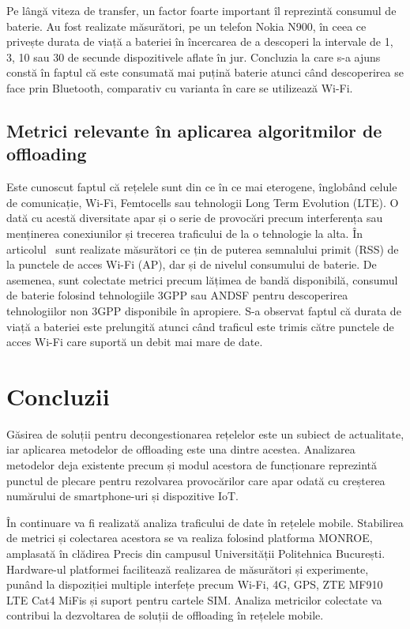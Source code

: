 \documentclass[12pt,a4paper]{report}
\begin{document}
Pe lângă viteza de transfer, un factor foarte important îl reprezintă consumul de baterie. Au fost realizate măsurători, pe un telefon Nokia N900, în ceea ce privește durata de viață a bateriei în încercarea de a descoperi la intervale de 1, 3, 10 sau 30 de secunde dispozitivele aflate în jur. Concluzia la care s-a ajuns constă în faptul că este consumată mai puțină baterie atunci când descoperirea se face prin Bluetooth, comparativ cu varianta în care se utilizează Wi-Fi.

\section{Metrici relevante în aplicarea algoritmilor de offloading}
Este cunoscut faptul că rețelele sunt din ce în ce mai eterogene, înglobând celule de comunicație, Wi-Fi, Femtocells sau tehnologii Long Term Evolution (LTE). O dată cu acestă diversitate apar și o serie de provocări precum interferența sau menținerea conexiunilor și trecerea traficului de la o tehnologie la alta. În articolul~\cite{traffic_steering} sunt realizate măsurători ce țin de puterea semnalului primit (RSS) de la punctele de acces Wi-Fi (AP), dar și de nivelul consumului de baterie. De asemenea, sunt colectate metrici precum lățimea de bandă disponibilă, consumul de baterie folosind tehnologiile 3GPP sau ANDSF pentru descoperirea tehnologiilor non 3GPP disponibile în apropiere. 
S-a observat faptul că durata de viață a bateriei este prelungită atunci când traficul este trimis către punctele de acces Wi-Fi care suportă un debit mai mare de date.

\chapter{Concluzii}
Găsirea de soluții pentru decongestionarea rețelelor este un subiect de actualitate, iar aplicarea metodelor de offloading este una dintre acestea. Analizarea metodelor deja existente precum și modul acestora de funcționare reprezintă punctul de plecare pentru rezolvarea provocărilor care apar odată cu creșterea numărului de smartphone-uri și dispozitive IoT.

În continuare va fi realizată analiza traficului de date în rețelele mobile. Stabilirea de metrici și colectarea acestora se va realiza folosind platforma MONROE\protect\footnotemark {}, amplasată în clădirea Precis din campusul Universității Politehnica București. Hardware-ul platformei facilitează realizarea de măsurători și experimente, punând la dispoziției multiple interfețe precum Wi-Fi, 4G, GPS, ZTE MF910 LTE Cat4
MiFis și suport pentru cartele SIM. Analiza metricilor colectate va contribui la dezvoltarea de soluții de offloading în rețelele mobile.



\end{document}
